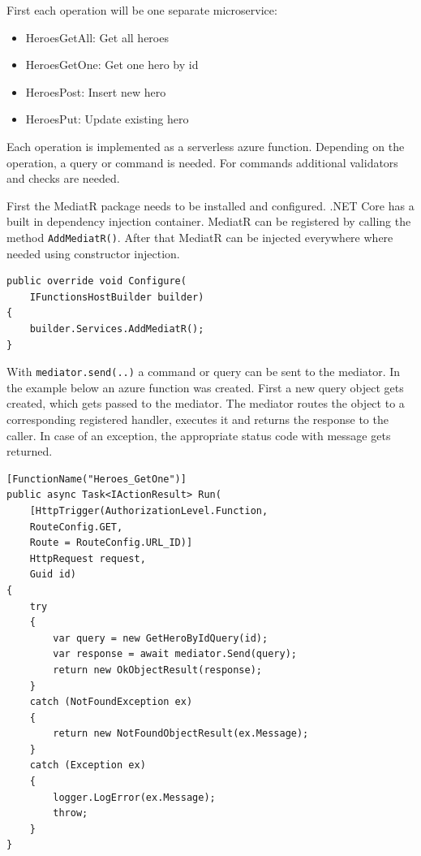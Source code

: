 \documentclass[11pt,conference]{IEEEtran}
\begin{document}
First each operation will be one separate microservice:

\begin{itemize}
    \item {HeroesGetAll: Get all heroes}
    \item {HeroesGetOne: Get one hero by id}
    \item {HeroesPost: Insert new hero}
    \item {HeroesPut: Update existing hero}
\end{itemize}

Each operation is implemented as a serverless azure function.
Depending on the operation, a query or command is needed.
For commands additional validators and checks are needed.

First the MediatR package needs to be installed and configured.
.NET Core has a built in dependency injection container.
MediatR can be registered by calling the method \texttt{AddMediatR()}.
After that MediatR can be injected everywhere where needed using constructor injection.

\begin{lstlisting}[caption=Register MediatR]
public override void Configure(
    IFunctionsHostBuilder builder)
{
    builder.Services.AddMediatR();
}
\end{lstlisting}

With \texttt{mediator.send(..)} a command or query can be sent to the mediator.
In the example below an azure function was created.
First a new query object gets created, which gets passed to the mediator.
The mediator routes the object to a corresponding registered handler, executes it and returns the response to the caller.
In case of an exception, the appropriate status code with message gets returned.

\begin{lstlisting}[caption=Azure Function with MediatR]
[FunctionName("Heroes_GetOne")]
public async Task<IActionResult> Run(
    [HttpTrigger(AuthorizationLevel.Function,
    RouteConfig.GET,
    Route = RouteConfig.URL_ID)]
    HttpRequest request,
    Guid id)
{
    try
    {
        var query = new GetHeroByIdQuery(id);
        var response = await mediator.Send(query);
        return new OkObjectResult(response);
    }
    catch (NotFoundException ex)
    {
        return new NotFoundObjectResult(ex.Message);
    }
    catch (Exception ex)
    {
        logger.LogError(ex.Message);
        throw;
    }
}
\end{lstlisting}
\end{document}
